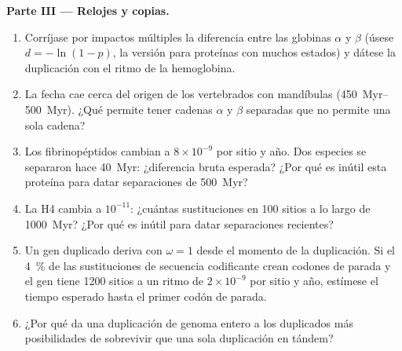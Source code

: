 \begin{problem}
\medskip
\noindent\textbf{Parte III --- Relojes y copias.}
\begin{enumerate}[resume]
  \item Corríjase por impactos múltiples la diferencia entre las
        globinas $\alpha$ y $\beta$ (úsese $d = -\ln(1 - p)$, la versión
        para proteínas con muchos estados) y dátese la duplicación con el
        ritmo de la hemoglobina.
  \item La fecha cae cerca del origen de los vertebrados con mandíbulas
        (\qtyrange{450}{500}{Myr}). ¿Qué permite tener cadenas $\alpha$ y
        $\beta$ separadas que no permite una sola cadena?
  \item Los fibrinopéptidos cambian a $8\times 10^{-9}$ por sitio y año.
        Dos especies se separaron hace \qty{40}{Myr}: ¿diferencia bruta
        esperada? ¿Por qué es inútil esta proteína para datar
        separaciones de \qty{500}{Myr}?
  \item La  H4 cambia a $10^{-11}$: ¿cuántas sustituciones en 100
        sitios a lo largo de \qty{1000}{Myr}? ¿Por qué es inútil para
        datar separaciones recientes?
  \item Un gen duplicado deriva con $\omega = 1$ desde el momento de la
        duplicación. Si el \qty{4}{\%} de las sustituciones de secuencia
        codificante crean codones de parada y el gen tiene 1200 sitios a
        un ritmo de $2\times
        10^{-9}$ por sitio y año, estímese el tiempo esperado hasta el
        primer codón de parada.
  \item ¿Por qué da una duplicación de genoma entero a los duplicados
        más posibilidades de sobrevivir que una sola duplicación en
        tándem?
\end{enumerate}


\end{problem}
